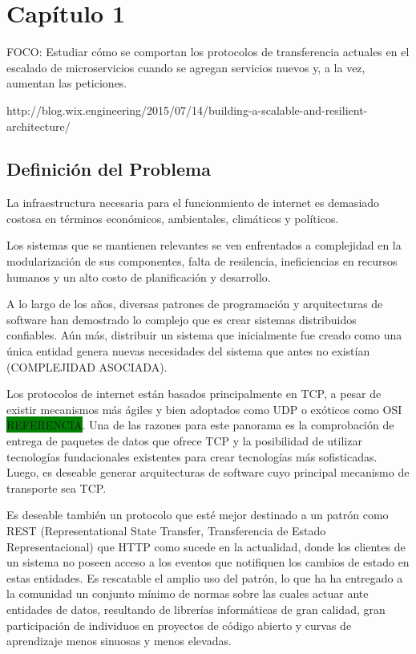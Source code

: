 \chapter{Capítulo 1}

FOCO: Estudiar cómo se comportan los protocolos de transferencia actuales en el escalado de microservicios cuando se agregan servicios nuevos y, a la vez, aumentan las peticiones.

http://blog.wix.engineering/2015/07/14/building-a-scalable-and-resilient-architecture/

\section{Definición del Problema}

La infraestructura necesaria para el funcionmiento de internet es demasiado costosa en términos económicos, ambientales, climáticos y políticos.

Los sistemas que se mantienen relevantes se ven enfrentados a complejidad en la modularización de sus componentes, falta de resilencia, ineficiencias en recursos humanos y un alto costo de planificación y desarrollo.

A lo largo de los años, diversas patrones de programación y arquitecturas de software han demostrado lo complejo que es crear sistemas distribuidos confiables. Aún más, distribuir un sistema que inicialmente fue creado como una única entidad genera nuevas necesidades del sistema que antes no existían (COMPLEJIDAD ASOCIADA).

Los protocolos de internet están basados principalmente en TCP, a pesar de existir mecanismos más ágiles y bien adoptados como UDP o exóticos como OSI \colorbox{green}{REFERENCIA}. Una de las razones para este panorama es la comprobación de entrega de paquetes de datos que ofrece TCP y la posibilidad de utilizar tecnologías fundacionales existentes para crear tecnologías más sofisticadas. Luego, es deseable generar arquitecturas de software cuyo principal mecanismo de transporte sea TCP.

Es deseable también un protocolo que esté mejor destinado a un patrón como REST (Representational State Transfer, Transferencia de Estado Representacional) que HTTP como sucede en la actualidad, donde los clientes de un sistema no poseen acceso a los eventos que notifiquen los cambios de estado en estas entidades. Es rescatable el amplio uso del patrón, lo que ha ha entregado a la comunidad un conjunto mínimo de normas sobre las cuales actuar ante entidades de datos, resultando de librerías informáticas de gran calidad, gran participación de individuos en proyectos de código abierto y curvas de aprendizaje menos sinuosas y menos elevadas.

